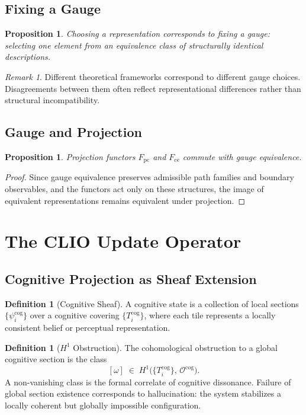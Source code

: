 \documentclass[11pt]{article}
\theoremstyle{plain}
\newtheorem{proposition}[theorem]{Proposition}
\theoremstyle{definition}
\newtheorem{definition}[theorem]{Definition}
\theoremstyle{remark}
\newtheorem{remark}[theorem]{Remark}
\newcommand{\Fpc}{F_{\mathrm{pc}}}
\newcommand{\Fce}{F_{\mathrm{ce}}}
\newcommand{\Hone}{H^1}
\begin{document}
\subsection{Fixing a Gauge}

\begin{proposition}
Choosing a representation corresponds to fixing a gauge: selecting one
element from an equivalence class of structurally identical descriptions.
\end{proposition}

\begin{remark}
Different theoretical frameworks correspond to different gauge choices.
Disagreements between them often reflect representational differences
rather than structural incompatibility.
\end{remark}

\subsection{Gauge and Projection}

\begin{proposition}
Projection functors $\Fpc$ and $\Fce$ commute with gauge equivalence.
\end{proposition}

\begin{proof}
Since gauge equivalence preserves admissible path families and boundary
observables, and the functors act only on these structures, the image
of equivalent representations remains equivalent under projection.
\end{proof}

\section{The CLIO Update Operator}

\subsection{Cognitive Projection as Sheaf Extension}

\begin{definition}[Cognitive Sheaf]
A cognitive state is a collection of local sections
$\{\psi_i^{\mathrm{cog}}\}$ over a cognitive covering
$\{T_i^{\mathrm{cog}}\}$, where each tile represents a locally consistent
belief or perceptual representation.
\end{definition}

\begin{definition}[$\Hone$ Obstruction]
The cohomological obstruction to a global cognitive section is the class
\[
  [\omega] \;\in\; \Hone\!\bigl(\{T_i^{\mathrm{cog}}\},\,
  \mathcal{O}^{\mathrm{cog}}\bigr).
\]
A non-vanishing class is the formal correlate of cognitive dissonance.
Failure of global section existence corresponds to hallucination: the
system stabilizes a locally coherent but globally impossible configuration.
\end{definition}
\end{document}
